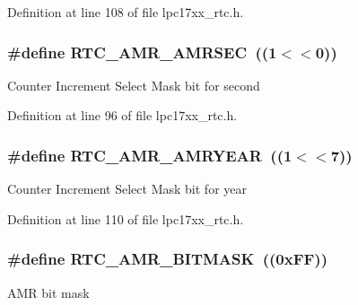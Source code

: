 \-Definition at line 108 of file lpc17xx\-\_\-rtc.\-h.

\hypertarget{group___r_t_c___private___macros_ga63765d3a556f4948a67cdce49e75f3c9}{
\subsubsection[{\-R\-T\-C\-\_\-\-A\-M\-R\-\_\-\-A\-M\-R\-S\-E\-C}]{\setlength{\rightskip}{0pt plus 5cm}\#define {\bf \-R\-T\-C\-\_\-\-A\-M\-R\-\_\-\-A\-M\-R\-S\-E\-C}~((1$<$$<$0))}}\label{group___r_t_c___private___macros_ga63765d3a556f4948a67cdce49e75f3c9}
\-Counter \-Increment \-Select \-Mask bit for second 

\-Definition at line 96 of file lpc17xx\-\_\-rtc.\-h.

\hypertarget{group___r_t_c___private___macros_ga68aeedc4bbe4df763e95020b49692fd8}{
\subsubsection[{\-R\-T\-C\-\_\-\-A\-M\-R\-\_\-\-A\-M\-R\-Y\-E\-A\-R}]{\setlength{\rightskip}{0pt plus 5cm}\#define {\bf \-R\-T\-C\-\_\-\-A\-M\-R\-\_\-\-A\-M\-R\-Y\-E\-A\-R}~((1$<$$<$7))}}\label{group___r_t_c___private___macros_ga68aeedc4bbe4df763e95020b49692fd8}
\-Counter \-Increment \-Select \-Mask bit for year 

\-Definition at line 110 of file lpc17xx\-\_\-rtc.\-h.

\hypertarget{group___r_t_c___private___macros_ga751d75546e8d96c96e0eb14791361561}{
\subsubsection[{\-R\-T\-C\-\_\-\-A\-M\-R\-\_\-\-B\-I\-T\-M\-A\-S\-K}]{\setlength{\rightskip}{0pt plus 5cm}\#define {\bf \-R\-T\-C\-\_\-\-A\-M\-R\-\_\-\-B\-I\-T\-M\-A\-S\-K}~((0x\-F\-F))}}\label{group___r_t_c___private___macros_ga751d75546e8d96c96e0eb14791361561}
\-A\-M\-R bit mask 

